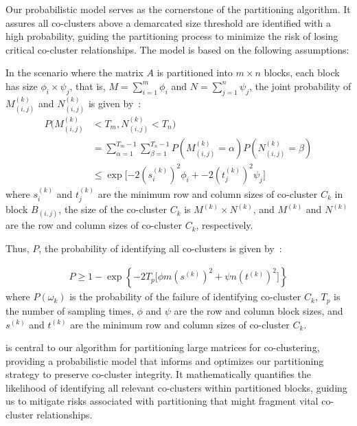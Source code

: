 \documentclass[journal]{IEEEtran}
\begin{document}
Our probabilistic model serves as the cornerstone of the partitioning algorithm. It assures all co-clusters above a demarcated size threshold are identified with a high probability, guiding the partitioning process to minimize the risk of losing critical co-cluster relationships. The model is based on the following assumptions:

In the scenario where the matrix $A$ is partitioned into $m \times n$ blocks, each block has size $\phi_i \times \psi_j$, that is, $M=\sum_{i=1}^m \phi_i$ and $N=\sum_{j=1}^n \psi_j$, the joint probability of $M_{(i,j)}^{(k)}$ and $N_{(i,j)}^{(k)}$ is given by~:
\begin{equation}
    \begin{split}
        P(M_{(i,j)}^{(k)} & < T_m, N_{(i,j)}^{(k)} < T_n)                                                                           \\
                          & = \sum_{\alpha=1}^{T_m-1} \sum_{\beta=1}^{T_n-1} P(M_{(i,j)}^{(k)} = \alpha) P(N_{(i,j)}^{(k)} = \beta) \\
                          & \le \exp[-2 (s_i^{(k)})^2 \phi_i + -2 (t_j^{(k)})^2 \psi_j\rbrack
    \end{split}
\end{equation}
where $s_i^{(k)}$ and $t_j^{(k)}$ are the minimum row and column sizes of co-cluster $C_k$ in block $B_{(i,j)}$, the size of the co-cluster $C_k$ is $M^{(k)} \times N^{(k)}$, and $M^{(k)}$ and $N^{(k)}$ are the row and column sizes of co-cluster $C_k$, respectively.

Thus, $P$, the probability of identifying all co-clusters is given by~:

\begin{equation}
    \begin{split}
        P \ge 1 - \exp \left\{ -2 T_p \lbrack \phi m (s^{(k)})^2 + \psi n (t^{(k)})^2\rbrack  \right\} \label{eq:prob_of_identifying_all_co_clusters}
    \end{split}
\end{equation}
where $P(\omega_k)$ is the probability of the failure of identifying co-cluster $C_k$, $T_p$ is the number of sampling times, $\phi$ and $\psi$ are the row and column block sizes, and $s^{(k)}$ and $t^{(k)}$ are the minimum row and column sizes of co-cluster $C_k$.

 is central to our algorithm for partitioning large matrices for co-clustering, providing a probabilistic model that informs and optimizes our partitioning strategy to preserve co-cluster integrity. It mathematically quantifies the likelihood of identifying all relevant co-clusters within partitioned blocks, guiding us to mitigate risks associated with partitioning that might fragment vital co-cluster relationships.
\end{document}
